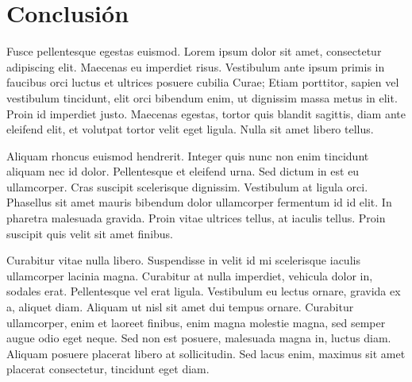\documentclass[final,narroweqnarray,inline]{ieee}
\begin{document}
\clearpage
\section{Conclusión}

Fusce pellentesque egestas euismod. Lorem ipsum dolor sit amet, consectetur adipiscing elit. Maecenas eu imperdiet risus. Vestibulum ante ipsum primis in faucibus orci luctus et ultrices posuere cubilia Curae; Etiam porttitor, sapien vel vestibulum tincidunt, elit orci bibendum enim, ut dignissim massa metus in elit. Proin id imperdiet justo. Maecenas egestas, tortor quis blandit sagittis, diam ante eleifend elit, et volutpat tortor velit eget ligula. Nulla sit amet libero tellus.

Aliquam rhoncus euismod hendrerit. Integer quis nunc non enim tincidunt aliquam nec id dolor. Pellentesque et eleifend urna. Sed dictum in est eu ullamcorper. Cras suscipit scelerisque dignissim. Vestibulum at ligula orci. Phasellus sit amet mauris bibendum dolor ullamcorper fermentum id id elit. In pharetra malesuada gravida. Proin vitae ultrices tellus, at iaculis tellus. Proin suscipit quis velit sit amet finibus.

Curabitur vitae nulla libero. Suspendisse in velit id mi scelerisque iaculis ullamcorper lacinia magna. Curabitur at nulla imperdiet, vehicula dolor in, sodales erat. Pellentesque vel erat ligula. Vestibulum eu lectus ornare, gravida ex a, aliquet diam. Aliquam ut nisl sit amet dui tempus ornare. Curabitur ullamcorper, enim et laoreet finibus, enim magna molestie magna, sed semper augue odio eget neque. Sed non est posuere, malesuada magna in, luctus diam. Aliquam posuere placerat libero at sollicitudin. Sed lacus enim, maximus sit amet placerat consectetur, tincidunt eget diam.

%
%



\end{document}
